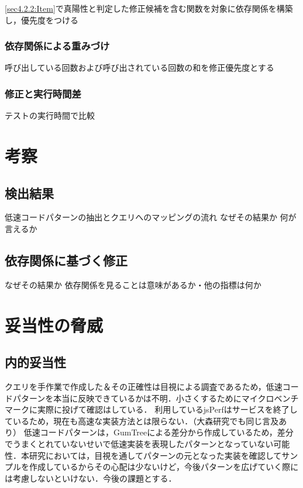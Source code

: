 \documentclass[submit,techrep,noauthor]{ipsj}
\begin{document}
\ref{sec4.2.2:Item}で真陽性と判定した修正候補を含む関数を対象に依存関係を構築し，優先度をつける

\subsubsection{依存関係による重みづけ}

呼び出している回数および呼び出されている回数の和を修正優先度とする

\subsubsection{修正と実行時間差}

テストの実行時間で比較


\section{考察}
\label{sec5:format}




\subsection{検出結果}

低速コードパターンの抽出とクエリへのマッピングの流れ
なぜその結果か
何が言えるか

\subsection{依存関係に基づく修正}

なぜその結果か
依存関係を見ることは意味があるか・他の指標は何か

\section{妥当性の脅威}
\label{sec6:format}

\subsection{内的妥当性}
クエリを手作業で作成した＆その正確性は目視による調査であるため，低速コードパターンを本当に反映できているかは不明．小さくするためにマイクロベンチマークに実際に投げて確認はしている．
利用しているjsPerfはサービスを終了しているため，現在も高速な実装方法とは限らない．（大森研究でも同じ言及あり）
低速コードパターンは，GumTreeによる差分から作成しているため，差分でうまくとれていないせいで低速実装を表現したパターンとなっていない可能性．本研究においては，目視を通してパターンの元となった実装を確認してサンプルを作成しているからその心配は少ないけど，今後パターンを広げていく際には考慮しないといけない．今後の課題とする．
\end{document}
